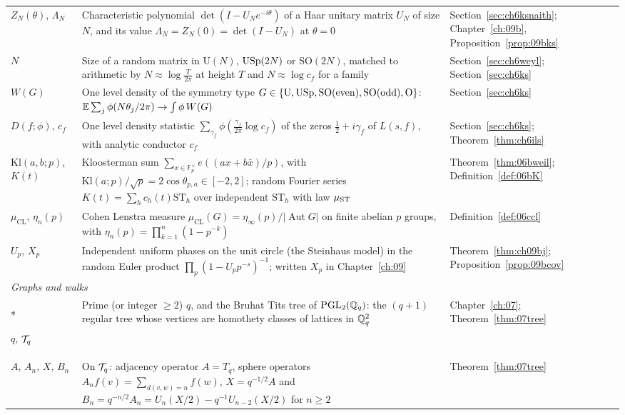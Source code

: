{\begin{longtable}{p{0.8in}p{2.65in}p{0.95in}}
\raggedright $Z_N(\theta)$, $\Lambda_N$ & \raggedright Characteristic polynomial $\det(I-U_Ne^{-i\theta})$ of a Haar unitary matrix $U_N$ of size $N$, and its value $\Lambda_N=Z_N(0)=\det(I-U_N)$ at $\theta=0$ & \raggedright Section~\ref{sec:ch6ksnaith}; Chapter~\ref{ch:09b}, Proposition~\ref{prop:09bks}\tabularnewline[1pt]
\raggedright $N$ & \raggedright Size of a random matrix in $\mathrm U(N)$, $\mathrm{USp}(2N)$ or $\mathrm{SO}(2N)$, matched to arithmetic by $N\approx\log\frac T{2\pi}$ at height $T$ and $N\approx\log c_f$ for a family & \raggedright Section~\ref{sec:ch6weyl}; Section~\ref{sec:ch6ks}\tabularnewline[1pt]
\raggedright $W(G)$ & \raggedright One level density of the symmetry type $G\in\{\mathrm U,\mathrm{USp},\mathrm{SO(even)},\mathrm{SO(odd)},\mathrm O\}$: $\mathbb{E}\sum_j\phi(N\theta_j/2\pi)\to\int\phi\,W(G)$ & \raggedright Section~\ref{sec:ch6ks}\tabularnewline[1pt]
\raggedright $D(f;\phi)$, $c_f$ & \raggedright One level density statistic $\sum_{\gamma_f}\phi(\frac{\gamma_f}{2\pi}\log c_f)$ of the zeros $\frac12+i\gamma_f$ of $L(s,f)$, with analytic conductor $c_f$ & \raggedright Section~\ref{sec:ch6ks}; Theorem~\ref{thm:ch6ils}\tabularnewline[1pt]
\raggedright $\mathrm{Kl}(a,b;p)$, $K(t)$ & \raggedright Kloosterman sum $\sum_{x\in\mathbb F_p^\times}e((ax+b\bar x)/p)$, with $\mathrm{Kl}(a;p)/\sqrt p=2\cos\theta_{p,a}\in[-2,2]$; random Fourier series $K(t)=\sum_hc_h(t)\mathrm{ST}_h$ over independent $\mathrm{ST}_h$ with law $\mu_{\mathrm{ST}}$ & \raggedright Theorem~\ref{thm:06bweil}; Definition~\ref{def:06bK}\tabularnewline[1pt]
\raggedright $\mu_{\mathrm{CL}}$, $\eta_n(p)$ & \raggedright Cohen Lenstra measure $\mu_{\mathrm{CL}}(G)=\eta_\infty(p)/|\operatorname{Aut}G|$ on finite abelian $p$ groups, with $\eta_n(p)=\prod_{k=1}^n(1-p^{-k})$ & \raggedright Definition~\ref{def:06ccl}\tabularnewline[1pt]
\raggedright $U_p$, $X_p$ & \raggedright Independent uniform phases on the unit circle (the Steinhaus model) in the random Euler product $\prod_p(1-U_pp^{-s})^{-1}$; written $X_p$ in Chapter~\ref{ch:09} & \raggedright Theorem~\ref{thm:ch09bj}; Proposition~\ref{prop:09bcov}\tabularnewline[1pt]
\midrule
\multicolumn{3}{l}{\textit{Graphs and walks}}\\*
\raggedright $q$, $\mathcal{T}_q$ & \raggedright Prime (or integer $\ge2$) $q$, and the Bruhat Tits tree of $\mathrm{PGL}_2(\mathbb{Q}_q)$: the $(q+1)$ regular tree whose vertices are homothety classes of lattices in $\mathbb{Q}_q^2$ & \raggedright Chapter~\ref{ch:07}; Theorem~\ref{thm:07tree}\tabularnewline[1pt]
\raggedright $A$, $A_n$, $X$, $B_n$ & \raggedright On $\mathcal{T}_q$: adjacency operator $A=T_q$, sphere operators $A_nf(v)=\sum_{d(v,w)=n}f(w)$, $X=q^{-1/2}A$ and $B_n=q^{-n/2}A_n=U_n(X/2)-q^{-1}U_{n-2}(X/2)$ for $n\ge2$ & \raggedright Theorem~\ref{thm:07tree}\tabularnewline[1pt]

\end{longtable}}
